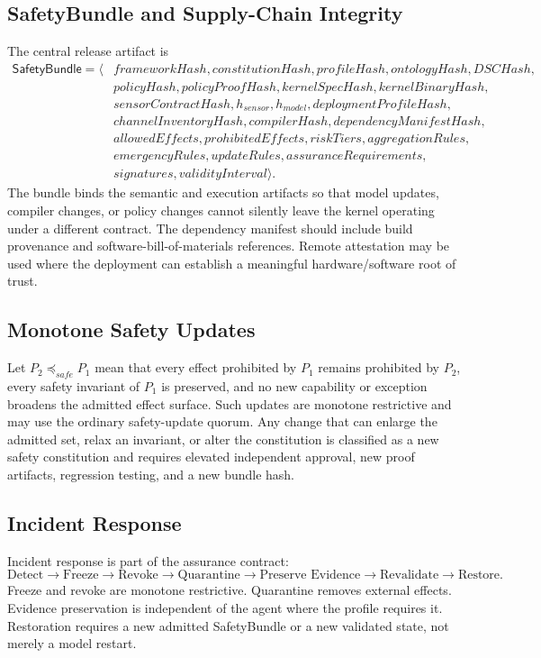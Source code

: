 \documentclass[11pt]{article}
\def\ensuremath#1{#1}%
\def\mathrm#1{#1}%
\newcommand{\SafetyBundle}{\textsf{SafetyBundle}}
\newcommand{\ModelHash}{\ensuremath{h_{\mathrm{model}}}}
\newcommand{\SensorHash}{\ensuremath{h_{\mathrm{sensor}}}}
\begin{document}
\subsection{\SafetyBundle{} and Supply-Chain Integrity}
The central release artifact is
\[
\begin{aligned}
\SafetyBundle=\langle&frameworkHash,constitutionHash,profileHash,ontologyHash,DSCHash,\\
&policyHash,policyProofHash,kernelSpecHash,kernelBinaryHash,\\
&sensorContractHash,\SensorHash,\ModelHash,deploymentProfileHash,\\
&channelInventoryHash,compilerHash,dependencyManifestHash,\\
&allowedEffects,prohibitedEffects,riskTiers,aggregationRules,\\
&emergencyRules,updateRules,assuranceRequirements,\\
&signatures,validityInterval\rangle.
\end{aligned}
\]
The bundle binds the semantic and execution artifacts so that model updates, compiler changes, or policy changes cannot silently leave the kernel operating under a different contract. The dependency manifest should include build provenance and software-bill-of-materials references. Remote attestation may be used where the deployment can establish a meaningful hardware/software root of trust.

\subsection{Monotone Safety Updates}
Let \(P_2\preceq_{safe}P_1\) mean that every effect prohibited by \(P_1\) remains prohibited by \(P_2\), every safety invariant of \(P_1\) is preserved, and no new capability or exception broadens the admitted effect surface. Such updates are monotone restrictive and may use the ordinary safety-update quorum. Any change that can enlarge the admitted set, relax an invariant, or alter the constitution is classified as a new safety constitution and requires elevated independent approval, new proof artifacts, regression testing, and a new bundle hash.

\subsection{Incident Response}
Incident response is part of the assurance contract:
\[
\text{Detect}\rightarrow\text{Freeze}\rightarrow\text{Revoke}\rightarrow\text{Quarantine}\rightarrow\text{Preserve Evidence}\rightarrow\text{Revalidate}\rightarrow\text{Restore}.
\]
Freeze and revoke are monotone restrictive. Quarantine removes external effects. Evidence preservation is independent of the agent where the profile requires it. Restoration requires a new admitted \SafetyBundle{} or a new validated state, not merely a model restart.
\end{document}

